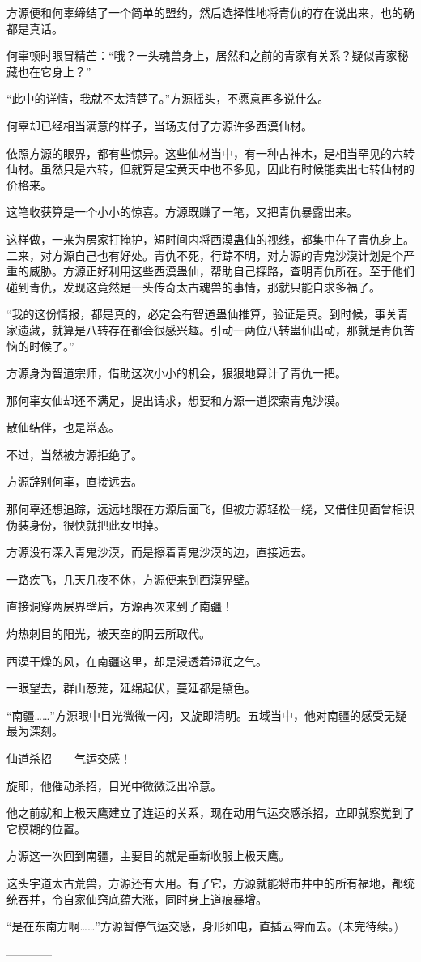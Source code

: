 \begin{this_body}
方源便和何辜缔结了一个简单的盟约，然后选择性地将青仇的存在说出来，也的确都是真话。

何辜顿时眼冒精芒：“哦？一头魂兽身上，居然和之前的青家有关系？疑似青家秘藏也在它身上？”

“此中的详情，我就不太清楚了。”方源摇头，不愿意再多说什么。

何辜却已经相当满意的样子，当场支付了方源许多西漠仙材。

依照方源的眼界，都有些惊异。这些仙材当中，有一种古神木，是相当罕见的六转仙材。虽然只是六转，但就算是宝黄天中也不多见，因此有时候能卖出七转仙材的价格来。

这笔收获算是一个小小的惊喜。方源既赚了一笔，又把青仇暴露出来。

这样做，一来为房家打掩护，短时间内将西漠蛊仙的视线，都集中在了青仇身上。二来，对方源自己也有好处。青仇不死，行踪不明，对方源的青鬼沙漠计划是个严重的威胁。方源正好利用这些西漠蛊仙，帮助自己探路，查明青仇所在。至于他们碰到青仇，发现这竟然是一头传奇太古魂兽的事情，那就只能自求多福了。

“我的这份情报，都是真的，必定会有智道蛊仙推算，验证是真。到时候，事关青家遗藏，就算是八转存在都会很感兴趣。引动一两位八转蛊仙出动，那就是青仇苦恼的时候了。”

方源身为智道宗师，借助这次小小的机会，狠狠地算计了青仇一把。

那何辜女仙却还不满足，提出请求，想要和方源一道探索青鬼沙漠。

散仙结伴，也是常态。

不过，当然被方源拒绝了。

方源辞别何辜，直接远去。

那何辜还想追踪，远远地跟在方源后面飞，但被方源轻松一绕，又借住见面曾相识伪装身份，很快就把此女甩掉。

方源没有深入青鬼沙漠，而是擦着青鬼沙漠的边，直接远去。

一路疾飞，几天几夜不休，方源便来到西漠界壁。

直接洞穿两层界壁后，方源再次来到了南疆！

灼热刺目的阳光，被天空的阴云所取代。

西漠干燥的风，在南疆这里，却是浸透着湿润之气。

一眼望去，群山葱茏，延绵起伏，蔓延都是黛色。

“南疆……”方源眼中目光微微一闪，又旋即清明。五域当中，他对南疆的感受无疑最为深刻。

仙道杀招――气运交感！

旋即，他催动杀招，目光中微微泛出冷意。

他之前就和上极天鹰建立了连运的关系，现在动用气运交感杀招，立即就察觉到了它模糊的位置。

方源这一次回到南疆，主要目的就是重新收服上极天鹰。

这头宇道太古荒兽，方源还有大用。有了它，方源就能将市井中的所有福地，都统统吞并，令自家仙窍底蕴大涨，同时身上道痕暴增。

“是在东南方啊……”方源暂停气运交感，身形如电，直插云霄而去。(未完待续。)

------------

\end{this_body}

